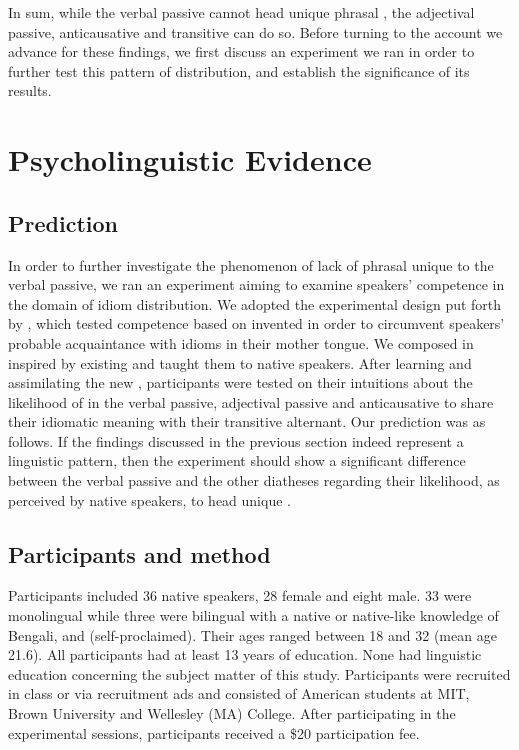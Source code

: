 \documentclass[output=paper]{langsci/langscibook}
\begin{document}
\largerpage
In sum, while the verbal passive cannot head unique phrasal , the
adjectival passive, anticausative and transitive can do so. Before turning to
the account we advance for these findings, we first discuss an experiment we
ran in order to further test this pattern of distribution, and establish the
significance of its results.

\section{Psycholinguistic Evidence}\label{sec:key:20.3}

\subsection{Prediction} %

In order to further investigate the phenomenon of lack of phrasal  unique
to the verbal passive, we ran an experiment aiming to examine speakers’
competence in the domain of idiom distribution. We adopted the experimental
design put forth by \textcite{SilHorKluWex2018}, which tested competence based
on invented  in order to circumvent speakers’ probable acquaintance with
idioms in their mother tongue. We composed  in  inspired by
existing   and taught them to native  speakers. After
learning and assimilating the new , participants were tested on their
intuitions about the likelihood of  in the verbal passive, adjectival
passive and anticausative to share their idiomatic meaning with their
transitive alternant. Our prediction was as follows. If the findings discussed
in the previous section indeed represent a linguistic pattern, then the
experiment should show a significant difference between the verbal passive and
the other diatheses regarding their likelihood, as perceived by native
speakers, to head unique .

\subsection{Participants and method} %

Participants included 36 native  speakers, 28 female and eight male.
33 were monolingual while three were bilingual with a native or native-like
knowledge of Bengali,  and  (self-proclaimed). Their
ages ranged between 18 and 32 (mean age 21.6).  All participants had at least
13 years of education.  None had linguistic education concerning the subject
matter of this study.  Participants were recruited in class or via recruitment
ads and consisted of American students at MIT, Brown University and Wellesley
(MA) College. After participating in the experimental sessions, participants
received a \$20 participation fee.
\end{document}
